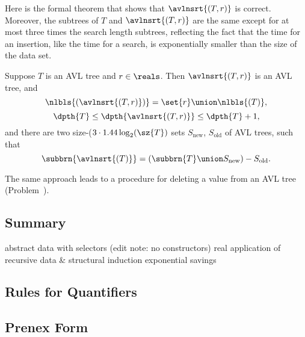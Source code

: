 \begin{definition}
Here is the formal theorem that shows that $\avlnsrt{(T,r)}$ is
correct.  Moreover, the subtrees of $T$ and $\avlnsrt{(T,r)}$ are the
same except for at most three times the search length subtrees,
reflecting the fact that the time for an insertion, like the time for
a search, is exponentially smaller than the size of the data set.

\begin{theorem}\label{thm:correct-avl-insert}
Suppose $T$ is an AVL tree and $r \in \reals$.
Then $\avlnsrt{(T,r)}$ is an AVL tree, and
\[
\nlbls{(\avlnsrt{(T,r)})} = \set{r} \union \nlbls{(T)},
\]
\[
\dpth{T} \leq \dpth{\avlnsrt{(T,r)}} \leq \dpth{T}+1,
\]
and there are two size-($3\cdot 1.44 \log_2(\sz{T})$ sets $S_{\text{new}}$,
$S_{\text{old}}$ of AVL trees, such that
\[
\subbrn{\avlnsrt{(T)}} = (\subbrn{T}\union S_{\text{new}}) - S_{\text{old}}.
\]
\end{theorem}

The same approach leads to a procedure for deleting a value from an
AVL tree (Problem~).

\begin{editingnotes}
\subsection{Summary}
abstract data with selectors (edit note: no constructors)
real application of recursive data & structural induction
exponential savings
\end{editingnotes}

\begin{problems}
\practiceproblems
{}

\classproblems
{}

\homeworkproblems
{}

\examproblems
{}
\end{problems}

\begin{editingnotes}

\section{Rules for Quantifiers}

\subsection{Prenex Form}
\begin{problems}
\end{problems}
\end{editingnotes}


\end{definition}
